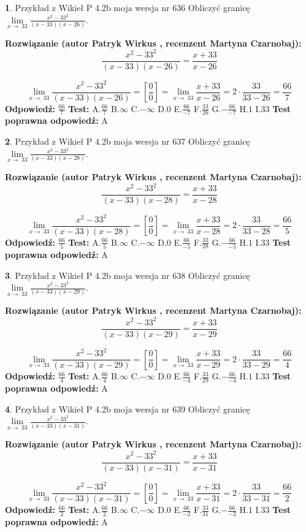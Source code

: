 \documentclass[12pt, a4paper]{article}
\theoremstyle{definition} %
\newtheorem{zad}{}
\newcommand{\zadStart}[1]{\begin{zad}#1\newline}
\newcommand{\zadStop}{\end{zad}}
\newcommand{\rozwStart}[2]{\noindent \textbf{Rozwiązanie (autor #1 , recenzent #2): }\newline}
\newcommand{\rozwStop}{\newline}
\newcommand{\odpStart}{\noindent \textbf{Odpowiedź:}\newline}
\newcommand{\odpStop}{\newline}
\newcommand{\testStart}{\noindent \textbf{Test:}\newline}
\newcommand{\testStop}{\newline}
\newcommand{\kluczStart}{\noindent \textbf{Test poprawna odpowiedź:}\newline}
\newcommand{\kluczStop}{\newline}
\begin{document}
\zadStart{Przykład z Wikieł P 4.2b moja wersja nr 636}
Obliczyć granicę $\lim\limits_{x\to\ 33}\frac{x^{2}-33^{2}}{(x-33)(x-26)}$.
\zadStop
\rozwStart{Patryk Wirkus}{Martyna Czarnobaj}
$$\frac{x^{2}-33^{2}}{(x-33)(x-26)}=\frac{x+33}{x-26}$$

$$\lim\limits_{x\to\ 33}\frac{x^{2}-33^{2}}{(x-33)(x-26)}=[\frac{0}{0}]=\lim\limits_{x\to\ 33}\frac{x+33}{x-26}=2 \cdot \frac{33}{33-26} = \frac{66}{7}$$
\rozwStop
\odpStart
$\frac{66}{7}$
\odpStop
\testStart
A.$\frac{66}{7}$
B.$\infty$
C.$-\infty$
D.$0$
E.$\frac{66}{-7}$
F.$\frac{33}{26}$
G.$-\frac{66}{-7}$
H.$1$
I.$33$
\testStop
\kluczStart
A
\kluczStop



\zadStart{Przykład z Wikieł P 4.2b moja wersja nr 637}
Obliczyć granicę $\lim\limits_{x\to\ 33}\frac{x^{2}-33^{2}}{(x-33)(x-28)}$.
\zadStop
\rozwStart{Patryk Wirkus}{Martyna Czarnobaj}
$$\frac{x^{2}-33^{2}}{(x-33)(x-28)}=\frac{x+33}{x-28}$$

$$\lim\limits_{x\to\ 33}\frac{x^{2}-33^{2}}{(x-33)(x-28)}=[\frac{0}{0}]=\lim\limits_{x\to\ 33}\frac{x+33}{x-28}=2 \cdot \frac{33}{33-28} = \frac{66}{5}$$
\rozwStop
\odpStart
$\frac{66}{5}$
\odpStop
\testStart
A.$\frac{66}{5}$
B.$\infty$
C.$-\infty$
D.$0$
E.$\frac{66}{-5}$
F.$\frac{33}{28}$
G.$-\frac{66}{-5}$
H.$1$
I.$33$
\testStop
\kluczStart
A
\kluczStop



\zadStart{Przykład z Wikieł P 4.2b moja wersja nr 638}
Obliczyć granicę $\lim\limits_{x\to\ 33}\frac{x^{2}-33^{2}}{(x-33)(x-29)}$.
\zadStop
\rozwStart{Patryk Wirkus}{Martyna Czarnobaj}
$$\frac{x^{2}-33^{2}}{(x-33)(x-29)}=\frac{x+33}{x-29}$$

$$\lim\limits_{x\to\ 33}\frac{x^{2}-33^{2}}{(x-33)(x-29)}=[\frac{0}{0}]=\lim\limits_{x\to\ 33}\frac{x+33}{x-29}=2 \cdot \frac{33}{33-29} = \frac{66}{4}$$
\rozwStop
\odpStart
$\frac{66}{4}$
\odpStop
\testStart
A.$\frac{66}{4}$
B.$\infty$
C.$-\infty$
D.$0$
E.$\frac{66}{-4}$
F.$\frac{33}{29}$
G.$-\frac{66}{-4}$
H.$1$
I.$33$
\testStop
\kluczStart
A
\kluczStop



\zadStart{Przykład z Wikieł P 4.2b moja wersja nr 639}
Obliczyć granicę $\lim\limits_{x\to\ 33}\frac{x^{2}-33^{2}}{(x-33)(x-31)}$.
\zadStop
\rozwStart{Patryk Wirkus}{Martyna Czarnobaj}
$$\frac{x^{2}-33^{2}}{(x-33)(x-31)}=\frac{x+33}{x-31}$$

$$\lim\limits_{x\to\ 33}\frac{x^{2}-33^{2}}{(x-33)(x-31)}=[\frac{0}{0}]=\lim\limits_{x\to\ 33}\frac{x+33}{x-31}=2 \cdot \frac{33}{33-31} = \frac{66}{2}$$
\rozwStop
\odpStart
$\frac{66}{2}$
\odpStop
\testStart
A.$\frac{66}{2}$
B.$\infty$
C.$-\infty$
D.$0$
E.$\frac{66}{-2}$
F.$\frac{33}{31}$
G.$-\frac{66}{-2}$
H.$1$
I.$33$
\testStop
\kluczStart
A
\kluczStop
\end{document}
